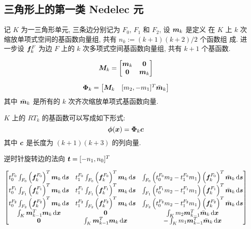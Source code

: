 \documentclass{article}
\begin{document}
\subsection{三角形上的第一类 Nedelec 元}
记 $K$ 为一三角形单元, 三条边分别记为 $F_0$, $F_1$ 和 $F_2$, 设 ${\boldsymbol m}_k$ 是定义
在 $K$ 上 $k$ 次缩放单项式空间的基函数向量组, 共有 $n_k:=(k+1)(k+2)/2$ 个函数组
成. 进一步设 ${\boldsymbol f}_{k}^F$ 为边 $F$ 上的 $k$ 次多项式空间基函数向量组,
共有 $k+1$ 个基函数.

$$
{\boldsymbol M}_k = 
    \begin{bmatrix}
        {\boldsymbol m}_{k} & \mathbf 0 \\ 
        \mathbf 0 & {\boldsymbol m}_{k} 
    \end{bmatrix} 
$$

$$
{\bm \Phi}_k = 
    \begin{bmatrix}
        {\boldsymbol M}_k & [m_2, -m_1]^T \bar{{\boldsymbol m}}_k\\ 
    \end{bmatrix} 
$$
其中 $\bar{{\boldsymbol m}}_k$ 是所有的 $k$ 次齐次缩放单项式基函数向量.

$K$ 上的  $RT_k$ 的基函数可以写成如下形式:
\begin{equation}
    {\bm \phi}({\boldsymbol x}) = {\bm \Phi}_{k}{\boldsymbol c} 
\end{equation}
其中 ${\boldsymbol c}$ 是长度为 $(k+1)(k+3)$ 的列向量.

逆时针旋转边的法向 ${\boldsymbol t} = [-n_1, n_0]^T$

\begin{align*}
    \begin{bmatrix}
        t_{0}^{F_0} \int_{F_0} \left({\boldsymbol f}_{k}^{F_0}\right)^T{\boldsymbol m}_{k}\,\mathrm d{\boldsymbol s} & 
        t_{1}^{F_0} \int_{F_0} \left({\boldsymbol f}_{k}^{F_0}\right)^T{\boldsymbol m}_{k}\,\mathrm d{\boldsymbol s} & 
        \int_{F_0} 
        \left(t_{0}^{F_0}m_2 - t_{1}^{F_0} m_1\right)
        \left({\boldsymbol f}_{k}^{F_0}\right)^T\bar{{\boldsymbol m}}_{k}\,\mathrm d{\boldsymbol s} \\ 
        t_{0}^{F_1} \int_{F_1} \left({\boldsymbol f}_{k}^{F_1}\right)^T{\boldsymbol m}_{k}\,\mathrm d{\boldsymbol s} & 
        t_{1}^{F_1} \int_{F_1} \left({\boldsymbol f}_{k}^{F_1}\right)^T{\boldsymbol m}_{k}\,\mathrm d{\boldsymbol s} & 
        \int_{F_1} 
        \left(t_{0}^{F_1}m_2 - t_{1}^{F_1}m_1\right)
        \left({\boldsymbol f}_{k}^{F_1}\right)^T\bar{{\boldsymbol m}}_{k}\,\mathrm d{\boldsymbol s} \\ 
        t_{0}^{F_2} \int_{F_2} \left({\boldsymbol f}_{k}^{F_2}\right)^T{\boldsymbol m}_{k}\,\mathrm d{\boldsymbol s} & 
        t_{1}^{F_2} \int_{F_2} \left({\boldsymbol f}_{k}^{F_2}\right)^T{\boldsymbol m}_{k}\,\mathrm d{\boldsymbol s} & 
        \int_{F_2} 
        \left(t_{0}^{F_2}m_2 - t_{1}^{F_2}m_1\right)\left({\boldsymbol f}_{k}^{F_2}\right)^T\bar{{\boldsymbol m}}_{k}\,\mathrm d{\boldsymbol s} \\ 
        \int_{K} {\boldsymbol m}_{k-1}^T{\boldsymbol m}_{k}\,\mathrm d{\boldsymbol x} & \mathbf 0 & 
        \int_{K} m_2{\boldsymbol m}_{k-1}^T\bar{{\boldsymbol m}}_{k} \,\mathrm d{\boldsymbol x} \\ 
        \mathbf 0 & \int_{K} {\boldsymbol m}_{k-1}^T{\boldsymbol m}_{k}\,\mathrm d{\boldsymbol x} & 
        -\int_{K} m_1{\boldsymbol m}_{k-1}^T\bar{{\boldsymbol m}}_{k} \,\mathrm d{\boldsymbol x} \\ 
    \end{bmatrix}
\end{align*}
\end{document}
